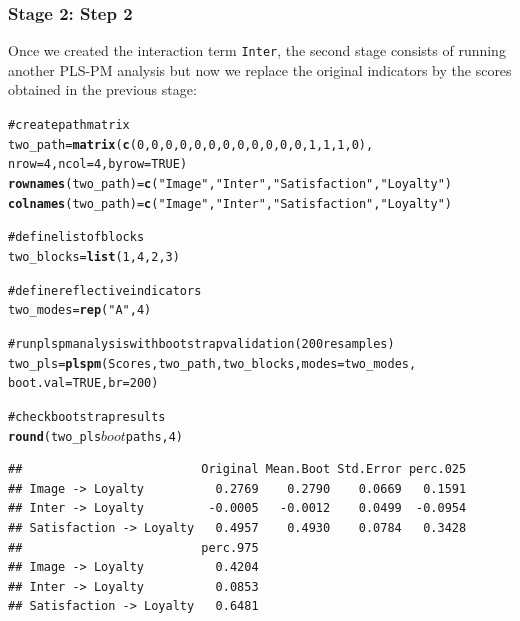 \documentclass[12pt]{book}\usepackage{graphicx, color}
\makeatletter
\newcommand{\hlfunctioncall}[1]{\textcolor[rgb]{0.501960784313725,0,0.329411764705882}{\textbf{#1}}}%
\newcommand{\hlstring}[1]{\textcolor[rgb]{0.6,0.6,1}{#1}}%
\newcommand{\hlcomment}[1]{\textcolor[rgb]{0.180392156862745,0.6,0.341176470588235}{#1}}%
\newenvironment{kframe}{%
 \def\at@end@of@kframe{}%
 \ifinner\ifhmode%
  \def\at@end@of@kframe{\end{minipage}}%
  \begin{minipage}{\columnwidth}%
 \fi\fi%
 \def\FrameCommand##1{\hskip\@totalleftmargin \hskip-\fboxsep
 \colorbox{shadecolor}{##1}\hskip-\fboxsep
     \hskip-\linewidth \hskip-\@totalleftmargin \hskip\columnwidth}%
 \MakeFramed {\advance\hsize-\width
   \@totalleftmargin\z@ \linewidth\hsize
   \@setminipage}}%
 {\par\unskip\endMakeFramed%
 \at@end@of@kframe}
\newenvironment{knitrout}{}{} %
\newcommand{\code}[1]{\texttt{#1}}
\makeatother
\begin{document}
\subsubsection*{Stage 2: Step 2}
Once we created the interaction term \code{Inter}, the second stage consists of running another PLS-PM analysis but now we replace the original indicators by the scores obtained in the previous stage:
\begin{knitrout}
\color{fgcolor}\begin{kframe}
\begin{alltt}
\hlcomment{# create path matrix}
two_path = \hlfunctioncall{matrix}(\hlfunctioncall{c}(0,0,0,0,0,0,0,0,0,0,0,0,1,1,1,0), 
                  nrow = 4, ncol = 4, byrow = TRUE)
\hlfunctioncall{rownames}(two_path) = \hlfunctioncall{c}(\hlstring{"Image"}, \hlstring{"Inter"}, \hlstring{"Satisfaction"}, \hlstring{"Loyalty"})
\hlfunctioncall{colnames}(two_path) = \hlfunctioncall{c}(\hlstring{"Image"}, \hlstring{"Inter"}, \hlstring{"Satisfaction"}, \hlstring{"Loyalty"})

\hlcomment{# define list of blocks}
two_blocks = \hlfunctioncall{list}(1, 4, 2, 3)

\hlcomment{# define reflective indicators}
two_modes= \hlfunctioncall{rep}(\hlstring{"A"}, 4)

\hlcomment{# run plspm analysis with bootstrap validation (200 resamples)}
two_pls = \hlfunctioncall{plspm}(Scores, two_path, two_blocks, modes = two_modes, 
                boot.val = TRUE, br = 200)

\hlcomment{# check bootstrap results}
\hlfunctioncall{round}(two_pls$boot$paths, 4)
\end{alltt}
\begin{verbatim}
##                         Original Mean.Boot Std.Error perc.025
## Image -> Loyalty          0.2769    0.2790    0.0669   0.1591
## Inter -> Loyalty         -0.0005   -0.0012    0.0499  -0.0954
## Satisfaction -> Loyalty   0.4957    0.4930    0.0784   0.3428
##                         perc.975
## Image -> Loyalty          0.4204
## Inter -> Loyalty          0.0853
## Satisfaction -> Loyalty   0.6481
\end{verbatim}
\end{kframe}
\end{knitrout}
\end{document}
